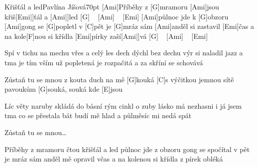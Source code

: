 \begin{song}{Křišťál a led}{Pavlína Jíšová}{70pt}
%
[Ami]Příběhy z [G]mramoru [Ami]jsou křiš[Emi|]{ťál a} [Ami|]{led} [G] ~ [Ami] ~ [Emi]{}
[Ami]půlnoc jde k [G]obzoru [Ami]gong se [G]popletl v [C]pět
je [G]mráz sám [Ami]anděl si zastavil [Emi]{čas}
a na kole[F]nou si křídla [Emi]pírky zaší[Ami|]{vá} [G] ~ [Ami] ~ [Emi]{}

%
Spí v tichu na mechu vřes a celý les
dech dýchl bez dechu výr si naladil jazz
a tma je tím vším už popletená
je rozpačitá a za skříní se schovává

\chorus%
[C]Zůstaň tu se mnou z kouta duch na mě [G]kouká
[C]s výčitkou jemnou sítě pavoukům [G]souká, souká
kde [E]jsou

%
Líc věty naruby skládá do básní
rým cinkl o zuby lásko má nezhasni
i já jsem tma co se přestala bát
budí mě hlad a půlměsíc mi nedá spát

\chorus%
Zůstaň tu se mnou\dots

%
Příběhy z mramoru čtou křišťál a led
půlnoc jde z obzoru gong se spočítal v pět
je mráz sám anděl mě opravil včas
a na kolenou si křídla z pírek obléká
\end{song}
